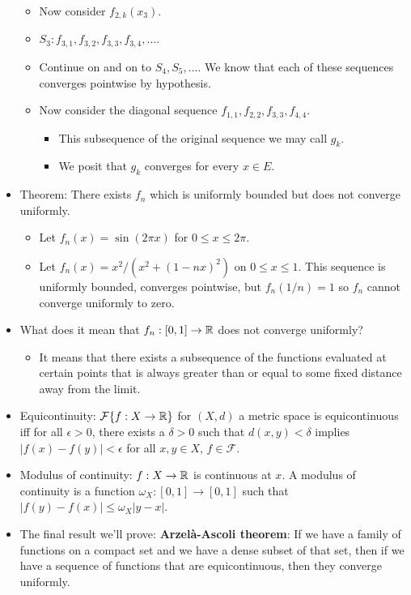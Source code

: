 \documentclass[../../notes.tex]{subfiles}
\begin{document}
\begin{itemize}
\begin{itemize}
        \item Now consider $f_{2,k}(x_3)$.
        \item $S_3:f_{3,1},f_{3,2},f_{3,3},f_{3,4},\dots$.
        \item Continue on and on to $S_4,S_5,\dots$. We know that each of these sequences converges pointwise by hypothesis.
        \item Now consider the diagonal sequence $f_{1,1},f_{2,2},f_{3,3},f_{4,4}$.
        \begin{itemize}
            \item This subsequence of the original sequence we may call $g_k$.
            \item We posit that $g_k$ converges for every $x\in E$. 
        \end{itemize}
    \end{itemize}
    \item Theorem: There exists $f_n$ which is uniformly bounded but does not converge uniformly.
    \begin{itemize}
        \item Let $f_n(x)=\sin(2\pi x)$ for $0\leq x\leq 2\pi$.
        \item Let $f_n(x)=x^2/(x^2+(1-nx)^2)$ on $0\leq x\leq 1$. This sequence is uniformly bounded, converges pointwise, but $f_n(1/n)=1$ so $f_n$ cannot converge uniformly to zero.
    \end{itemize}
    \item What does it mean that $f_n:[0,1]\to\mathbb{R}$ does not converge uniformly?
    \begin{itemize}
        \item It means that there exists a subsequence of the functions evaluated at certain points that is always greater than or equal to some fixed distance away from the limit.
    \end{itemize}
    \item Equicontinuity: $\mathcal{F}\{f:X\to\mathbb{R}\}$ for $(X,d)$ a metric space is equicontinuous iff for all $\epsilon>0$, there exists a $\delta>0$ such that $d(x,y)<\delta$ implies $|f(x)-f(y)|<\epsilon$ for all $x,y\in X$, $f\in\mathcal{F}$.
    \item Modulus of continuity: $f:X\to\mathbb{R}$ is continuous at $x$. A modulus of continuity is a function $\omega_X:[0,1]\to[0,1]$ such that $|f(y)-f(x)|\leq\omega_X|y-x|$.
    \item The final result we'll prove: \textbf{Arzel\`{a}-Ascoli theorem}: If we have a family of functions on a compact set and we have a dense subset of that set, then if we have a sequence of functions that are equicontinuous, then they converge uniformly.

\end{itemize}
\end{document}

